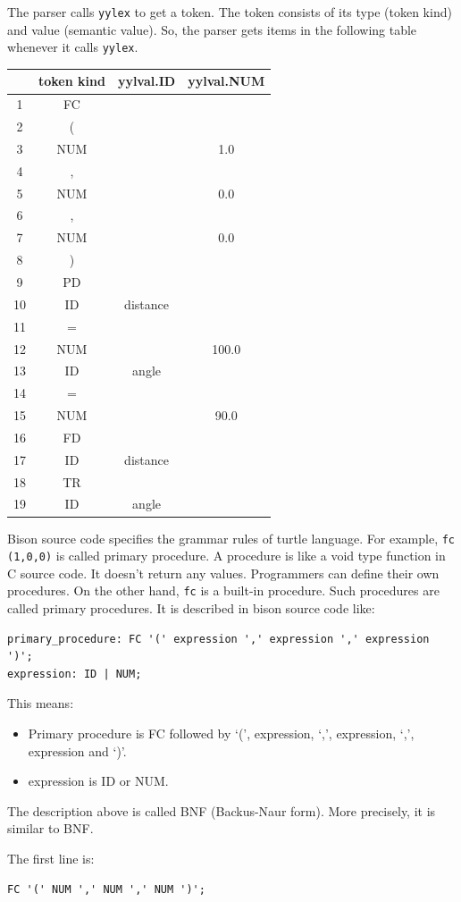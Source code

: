 The parser calls \passthrough{\lstinline!yylex!} to get a token. The
token consists of its type (token kind) and value (semantic value). So,
the parser gets items in the following table whenever it calls
\passthrough{\lstinline!yylex!}.

\begin{longtable}[]{@{}cccc@{}}
\toprule
& token kind & yylval.ID & yylval.NUM\tabularnewline
\midrule
\endhead
1 & FC & &\tabularnewline
2 & ( & &\tabularnewline
3 & NUM & & 1.0\tabularnewline
4 & , & &\tabularnewline
5 & NUM & & 0.0\tabularnewline
6 & , & &\tabularnewline
7 & NUM & & 0.0\tabularnewline
8 & ) & &\tabularnewline
9 & PD & &\tabularnewline
10 & ID & distance &\tabularnewline
11 & = & &\tabularnewline
12 & NUM & & 100.0\tabularnewline
13 & ID & angle &\tabularnewline
14 & = & &\tabularnewline
15 & NUM & & 90.0\tabularnewline
16 & FD & &\tabularnewline
17 & ID & distance &\tabularnewline
18 & TR & &\tabularnewline
19 & ID & angle &\tabularnewline
\bottomrule
\end{longtable}

Bison source code specifies the grammar rules of turtle language. For
example, \passthrough{\lstinline!fc (1,0,0)!} is called primary
procedure. A procedure is like a void type function in C source code. It
doesn't return any values. Programmers can define their own procedures.
On the other hand, \passthrough{\lstinline!fc!} is a built-in procedure.
Such procedures are called primary procedures. It is described in bison
source code like:

\begin{lstlisting}
primary_procedure: FC '(' expression ',' expression ',' expression ')';
expression: ID | NUM;
\end{lstlisting}

This means:

\begin{itemize}
\tightlist
\item
  Primary procedure is FC followed by `(', expression, `,', expression,
  `,', expression and `)'.
\item
  expression is ID or NUM.
\end{itemize}

The description above is called BNF (Backus-Naur form). More precisely,
it is similar to BNF.

The first line is:

\begin{lstlisting}
FC '(' NUM ',' NUM ',' NUM ')';
\end{lstlisting}

